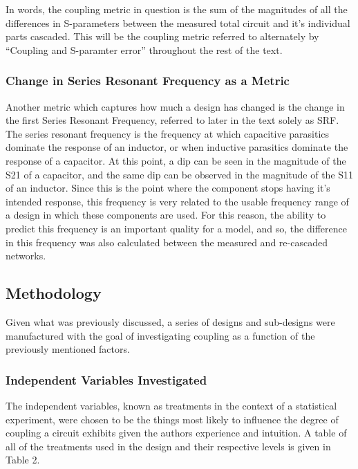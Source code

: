 \documentclass[12pt]{usfcoe}
\begin{document}
    In words, the coupling metric in question is the sum of the magnitudes of all the differences in S-parameters between the measured total circuit and it's individual parts cascaded. 
    This will be the coupling metric referred to alternately by ``Coupling and S-paramter error'' throughout the rest of the text. 
    
    \subsubsection{Change in Series Resonant Frequency as a Metric}
    
    Another metric which captures how much a design has changed is the change in the first Series Resonant Frequency, referred to later in the text solely as SRF. 
    The series resonant frequency is the frequency at which capacitive parasitics dominate the response of an inductor, or when inductive parasitics dominate the response of a capacitor. 
    At this point, a dip can be seen in the magnitude of the S21 of a capacitor, and the same dip can be observed in the magnitude of the S11 of an inductor. 
    Since this is the point where the component stops having it's intended response, this frequency is very related to the usable frequency range of a design in which these components are used.
    For this reason, the ability to predict this frequency is an important quality for a model, and so, the difference in this frequency was also calculated between the measured and re-cascaded networks.
    
    \subsection{Methodology}
    Given what was previously discussed, a series of designs and sub-designs were manufactured with the goal of investigating coupling as a function of the previously mentioned factors. 
    
    
    \subsubsection{Independent Variables Investigated} 
    
    The independent variables, known as treatments in the context of a statistical experiment, were chosen to be the things most likely to influence the degree of coupling a circuit exhibits given the authors experience and intuition. A table of all of the treatments used in the design and their respective levels is given in Table 2.
    
\end{document}
